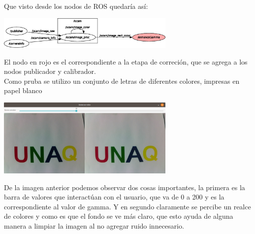 Que visto desde los nodos de ROS quedaría así:
\begin{center}
	\includegraphics[width=0.65\textwidth]{Contenido/Cuerpo/Capitulo4/Fig14.eps}
	\label{Fig9}
\end{center}
El nodo en rojo es el correspondiente a la etapa de correción, que se agrega a los nodos
publicador y calibrador.\\
Como pruba se utilizo un conjunto de letras de diferentes colores, impresas en papel blanco
\begin{center}
	\includegraphics[width=0.65\textwidth]{Contenido/Cuerpo/Capitulo4/Fig13.eps}
	\label{Fig9}
\end{center}
De la imagen anterior podemos observar dos cosas importantes, la primera es la barra de valores
que interactúan con el usuario, que va de 0 a 200 y es la correspondiente al valor de gamma. Y en
segundo claramente se percibe un realce de colores y como es que el fondo se ve más claro, que esto
ayuda de alguna manera a limpiar la imagen al no agregar ruido innecesario.


